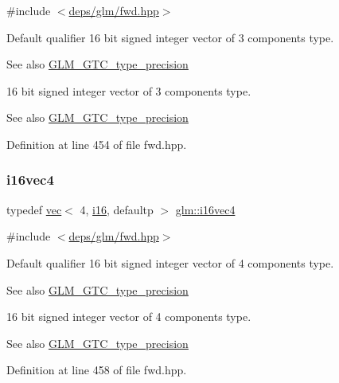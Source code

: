 {\ttfamily \#include $<$\hyperlink{fwd_8hpp}{deps/glm/fwd.\+hpp}$>$}

Default qualifier 16 bit signed integer vector of 3 components type. \begin{DoxySeeAlso}{See also}
\hyperlink{group__gtc__type__precision}{G\+L\+M\+\_\+\+G\+T\+C\+\_\+type\+\_\+precision}
\end{DoxySeeAlso}
16 bit signed integer vector of 3 components type. \begin{DoxySeeAlso}{See also}
\hyperlink{group__gtc__type__precision}{G\+L\+M\+\_\+\+G\+T\+C\+\_\+type\+\_\+precision} 
\end{DoxySeeAlso}


Definition at line 454 of file fwd.\+hpp.

\mbox{\label{group__gtc__type__precision_ga99a249a4cc129cb527c48d3afd38b666}} 
\subsubsection{\texorpdfstring{i16vec4}{i16vec4}}
{\footnotesize\ttfamily typedef \hyperlink{structglm_1_1vec}{vec}$<$ 4, \hyperlink{group__gtc__type__precision_ga35e5542ca05b29cc256fdafb8503d1fd}{i16}, defaultp $>$ \hyperlink{group__gtc__type__precision_ga99a249a4cc129cb527c48d3afd38b666}{glm\+::i16vec4}}



{\ttfamily \#include $<$\hyperlink{fwd_8hpp}{deps/glm/fwd.\+hpp}$>$}

Default qualifier 16 bit signed integer vector of 4 components type. \begin{DoxySeeAlso}{See also}
\hyperlink{group__gtc__type__precision}{G\+L\+M\+\_\+\+G\+T\+C\+\_\+type\+\_\+precision}
\end{DoxySeeAlso}
16 bit signed integer vector of 4 components type. \begin{DoxySeeAlso}{See also}
\hyperlink{group__gtc__type__precision}{G\+L\+M\+\_\+\+G\+T\+C\+\_\+type\+\_\+precision} 
\end{DoxySeeAlso}


Definition at line 458 of file fwd.\+hpp.

\mbox{\label{group__gtc__type__precision_ga1d8ed5c43e91ea7d4528389da4fa9524}} 
